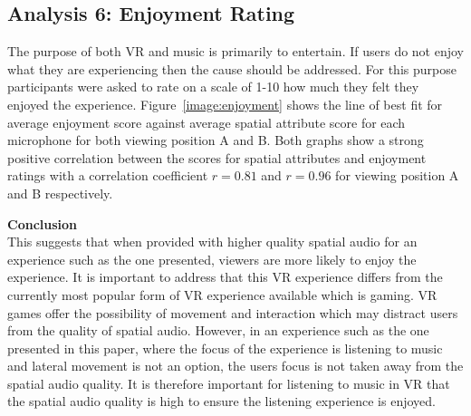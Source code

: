















\subsection{Analysis 6: Enjoyment Rating}

	The purpose of both VR and music is primarily to entertain. If users do not enjoy what they are experiencing then the cause should be addressed. For this purpose participants were asked to rate on a scale of 1-10 how much they felt they enjoyed the experience. Figure~\ref{image:enjoyment} shows the line of best fit for average enjoyment score against average spatial attribute score for each microphone for both viewing position A and B. Both graphs show a strong positive correlation between the scores for spatial attributes and enjoyment ratings with a correlation coefficient $r = 0.81$ and $r = 0.96$ for viewing position A and B respectively.

	\textbf{Conclusion} \\
	This suggests that when provided with higher quality spatial audio for an experience such as the one presented, viewers are more likely to enjoy the experience. It is important to address that this VR experience differs from the currently most popular form of VR experience available which is gaming. VR games offer the possibility of movement and interaction which may distract users from the quality of spatial audio. However, in an experience such as the one presented in this paper, where the focus of the experience is listening to music and lateral movement is not an option, the users focus is not taken away from the spatial audio quality. It is therefore important for listening to music in VR that the spatial audio quality is high to ensure the listening experience is enjoyed.



